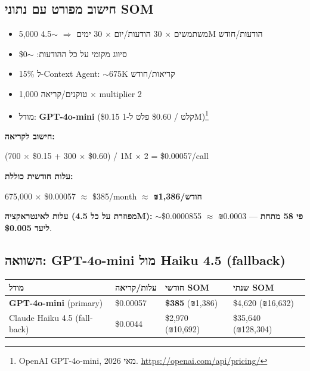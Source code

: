 \documentclass[11pt]{article}
\newcommand{\en}[1]{\textenglish{#1}}
\begin{document}
\subsection*{חישוב מפורט עם נתוני \en{SOM}}

\begin{itemize}[leftmargin=*]
  \item \en{5,000} משתמשים $\times$ \en{30} הודעות/יום $\times$ \en{30} ימים $\Rightarrow$ $\sim$\en{4.5M} הודעות/חודש
  \item סיווג מקומי על כל ההודעות: $\sim$\en{\$0}
  \item \en{15\%} ל-\en{Context Agent}: $\sim$\en{675K} קריאות/חודש
  \item \en{1,000} טוקנים/קריאה $\times$ \en{multiplier 2}
  \item מודל: \textbf{\en{GPT-4o-mini}} (\en{\$0.15} קלט / \en{\$0.60} פלט ל-\en{1M})\footnote{\en{OpenAI GPT-4o-mini}, מאי \en{2026}. \url{https://openai.com/api/pricing/}}
\end{itemize}

\textbf{חישוב לקריאה:}
\begin{center}
\textenglish{(700 $\times$ \$0.15 + 300 $\times$ \$0.60) / 1M $\times$ 2 = \$0.00057/call}
\end{center}

\textbf{עלות חודשית כוללת:}
\begin{center}
\textenglish{675,000 $\times$ \$0.00057 $\approx$ \$385/month} $\approx$ \textbf{₪\en{1,386}/חודש}
\end{center}

\textbf{עלות לאינטראקציה (מפוזרת על כל \en{4.5M}):} $\sim$\en{\$0.0000855} $\approx$ ₪\en{0.0003} — \textbf{פי \en{58} מתחת ליעד \en{\$0.005}}.

\subsection*{השוואה: \en{GPT-4o-mini} מול \en{Haiku 4.5} (\en{fallback})}

\begin{longtable}{|>{\raggedright\arraybackslash}p{4.5cm}|>{\raggedright\arraybackslash}p{2.5cm}|>{\raggedright\arraybackslash}p{3.0cm}|>{\raggedright\arraybackslash}p{3.5cm}|}
\hline
\rowcolor{hdr}
\textbf{מודל} & \textbf{עלות/קריאה} & \textbf{חודשי \en{SOM}} & \textbf{שנתי \en{SOM}} \\
\hline
\endhead
\textbf{\en{GPT-4o-mini}} (\en{primary}) & \en{\$0.00057} & \textbf{\en{\$385}} (₪\en{1,386}) & \en{\$4,620} (₪\en{16,632}) \\ \hline
\rowcolor{ltgray}
\en{Claude Haiku 4.5} (\en{fallback}) & \en{\$0.0044} & \en{\$2,970} (₪\en{10,692}) & \en{\$35,640} (₪\en{128,304}) \\ \hline
\end{longtable}
\end{document}
